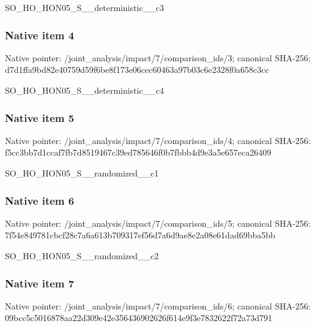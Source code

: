 \documentclass[10pt,a4paper]{article}
\begin{document}
\begingroup\raggedright\sloppy SO\_\allowbreak{}HO\_\allowbreak{}HON05\_\allowbreak{}S\_\allowbreak{}\_\allowbreak{}deterministic\_\allowbreak{}\_\allowbreak{}c3\par\endgroup

\subsubsection{Native item 4}
Native pointer: /joint\_\allowbreak{}analysis/impact/7/comparison\_\allowbreak{}ids/3; canonical SHA-256: d7d1ffa9bd82e40759d59f6be8f173e06cec60463a97b03c6e2328f0a658c3cc

\begingroup\raggedright\sloppy SO\_\allowbreak{}HO\_\allowbreak{}HON05\_\allowbreak{}S\_\allowbreak{}\_\allowbreak{}deterministic\_\allowbreak{}\_\allowbreak{}c4\par\endgroup

\subsubsection{Native item 5}
Native pointer: /joint\_\allowbreak{}analysis/impact/7/comparison\_\allowbreak{}ids/4; canonical SHA-256: f5cc3bb7d1ccaf7fb7d8519467c39ed785646f0b7fbbb4d9e3a5e657eca26409

\begingroup\raggedright\sloppy SO\_\allowbreak{}HO\_\allowbreak{}HON05\_\allowbreak{}S\_\allowbreak{}\_\allowbreak{}randomized\_\allowbreak{}\_\allowbreak{}c1\par\endgroup

\subsubsection{Native item 6}
Native pointer: /joint\_\allowbreak{}analysis/impact/7/comparison\_\allowbreak{}ids/5; canonical SHA-256: 7f54e849781cbcf28c7a6a613b709317ef56d7a6d9ae8e2a08e61dad69bba5bb

\begingroup\raggedright\sloppy SO\_\allowbreak{}HO\_\allowbreak{}HON05\_\allowbreak{}S\_\allowbreak{}\_\allowbreak{}randomized\_\allowbreak{}\_\allowbreak{}c2\par\endgroup

\subsubsection{Native item 7}
Native pointer: /joint\_\allowbreak{}analysis/impact/7/comparison\_\allowbreak{}ids/6; canonical SHA-256: 09bcc5c5016878aa22d309e42e356436902626f614e9f3e7832622f72a73d791
\end{document}
